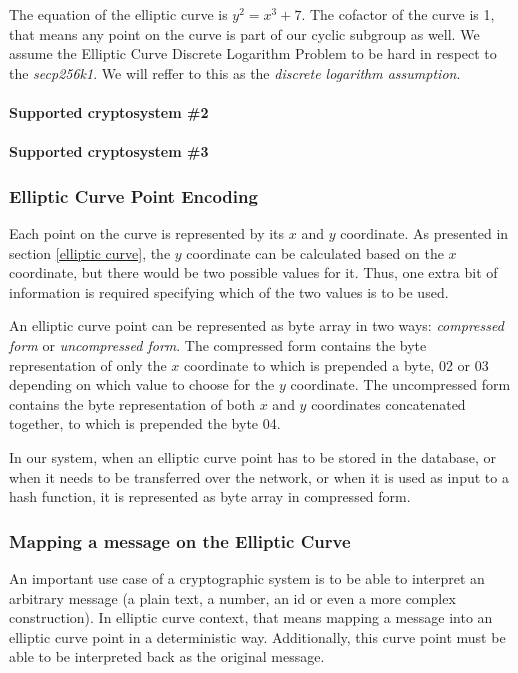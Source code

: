 The equation of the elliptic curve is \( y^2 = x^3 + 7 \). The cofactor of the curve is 1, that means any point on the curve is part of our cyclic subgroup as well. We assume the Elliptic Curve Discrete Logarithm Problem to be hard in respect to the \textit{secp256k1}. We will reffer to this as the \textit{discrete logarithm assumption}.

\paragraph{Supported cryptosystem \#2}

\paragraph{Supported cryptosystem \#3}

\subsubsection{Elliptic Curve Point Encoding}
Each point on the curve is represented by its $x$ and $y$ coordinate. As presented in section \ref{elliptic curve}, the $y$ coordinate can be calculated based on the $x$ coordinate, but there would be two possible values for it. Thus, one extra bit of information is required specifying which of the two values is to be used.

An elliptic curve point can be represented as byte array in two ways: \textit{compressed form} or \textit{uncompressed form}. The compressed form contains the byte representation of only the $x$ coordinate to which is prepended a byte, 02 or 03 depending on which value to choose for the $y$ coordinate. The uncompressed form contains the byte representation of both $x$ and $y$ coordinates concatenated together, to which is prepended the byte 04.

In our system, when an elliptic curve point has to be stored in the database, or when it needs to be transferred over the network, or when it is used as input to a hash function, it is represented as byte array in compressed form.

\subsubsection{Mapping a message on the Elliptic Curve}
An important use case of a cryptographic system is to be able to interpret an arbitrary message (a plain text, a number, an id or even a more complex construction). In elliptic curve context, that means mapping a message into an elliptic curve point in a deterministic way. Additionally, this curve point must be able to be interpreted back as the original message.

